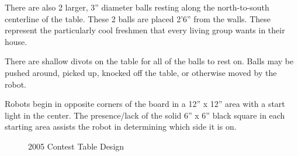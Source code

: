 There are also 2 larger, 3'' diameter balls resting along the
north-to-south centerline of the table.  These 2 balls are placed
2'6'' from the walls. These represent the particularly cool freshmen
that every living group wants in their house.

There are shallow divots on the table for all of the balls to
rest on.  Balls may be pushed around, picked up, knocked off the
table, or otherwise moved by the robot.

Robots begin in opposite corners of the board in a 12'' x 12'' area
with a start light in the center.  The presence/lack of the solid 6''
x 6'' black square in each starting area assists the robot in
determining which side it is on. 

\epsfysize=5.0in
\begin{figure}[htp]
\begin{center}
\caption{2005 Contest Table Design}
\label{tablepic}
\end{center}
\end{figure}


